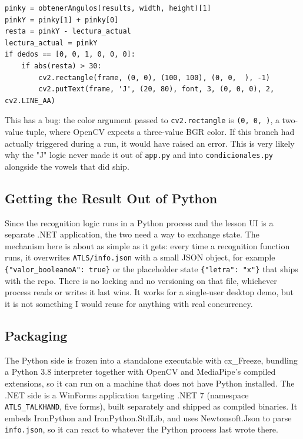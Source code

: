 \documentclass[11pt]{article}
\begin{document}
\begin{lstlisting}
pinky = obtenerAngulos(results, width, height)[1]
pinkY = pinky[1] + pinky[0]
resta = pinkY - lectura_actual
lectura_actual = pinkY
if dedos == [0, 0, 1, 0, 0, 0]:
    if abs(resta) > 30:
        cv2.rectangle(frame, (0, 0), (100, 100), (0, 0,  ), -1)
        cv2.putText(frame, 'J', (20, 80), font, 3, (0, 0, 0), 2, cv2.LINE_AA)
\end{lstlisting}

This has a bug: the color argument passed to \texttt{cv2.rectangle} is \texttt{(0, 0, )}, a two-value tuple, where OpenCV expects a three-value BGR color. If this branch had actually triggered during a run, it would have raised an error. This is very likely why the "J" logic never made it out of \texttt{app.py} and into \texttt{condicionales.py} alongside the vowels that did ship.

\subsection{Getting the Result Out of Python}

Since the recognition logic runs in a Python process and the lesson UI is a separate .NET application, the two need a way to exchange state. The mechanism here is about as simple as it gets: every time a recognition function runs, it overwrites \texttt{ATLS/info.json} with a small JSON object, for example \texttt{\{"valor\_booleanoA": true\}} or the placeholder state \texttt{\{"letra": "x"\}} that ships with the repo. There is no locking and no versioning on that file, whichever process reads or writes it last wins. It works for a single-user desktop demo, but it is not something I would reuse for anything with real concurrency.

\subsection{Packaging}

The Python side is frozen into a standalone executable with cx\_Freeze, bundling a Python 3.8 interpreter together with OpenCV and MediaPipe's compiled extensions, so it can run on a machine that does not have Python installed. The .NET side is a WinForms application targeting .NET 7 (namespace \texttt{ATLS\_TALKHAND}, five forms), built separately and shipped as compiled binaries. It embeds IronPython and IronPython.StdLib, and uses Newtonsoft.Json to parse \texttt{info.json}, so it can react to whatever the Python process last wrote there.
\end{document}
